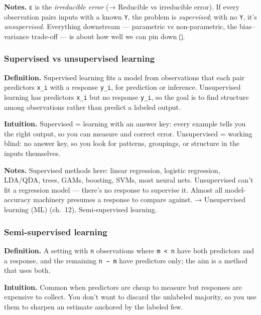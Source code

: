 \documentclass[
  10pt,
  letterpaper,
  onecolumn]{article}
\begin{document}
\textbf{Notes.} \texttt{ε} is the \emph{irreducible error} (→ Reducible
vs irreducible error). If every observation pairs inputs with a known
\texttt{Y}, the problem is \emph{supervised}; with no \texttt{Y}, it's
\emph{unsupervised}. Everything downstream --- parametric vs
non-parametric, the bias--variance trade-off --- is about how well we
can pin down \texttt{}.

\hypertarget{supervised-vs-unsupervised-learning}{%
\subsubsection{Supervised vs unsupervised
learning}\label{supervised-vs-unsupervised-learning}}

\textbf{Definition.} Supervised learning fits a model from observations
that each pair predictors \texttt{x\_i} with a response \texttt{y\_i},
for prediction or inference. Unsupervised learning has predictors
\texttt{x\_i} but no response \texttt{y\_i}, so the goal is to find
structure among observations rather than predict a labeled output.

\textbf{Intuition.} Supervised = learning with an answer key: every
example tells you the right output, so you can measure and correct
error. Unsupervised = working blind: no answer key, so you look for
patterns, groupings, or structure in the inputs themselves.

\textbf{Notes.} Supervised methods here: linear regression, logistic
regression, LDA/QDA, trees, GAMs, boosting, SVMs, most neural nets.
Unsupervised can't fit a regression model --- there's no response to
supervise it. Almost all model-accuracy machinery presumes a response to
compare against. → Unsupervised learning (ML) (ch.~12), Semi-supervised
learning.

\hypertarget{semi-supervised-learning}{%
\subsubsection{Semi-supervised
learning}\label{semi-supervised-learning}}

\textbf{Definition.} A setting with \texttt{n} observations where
\texttt{m\ \textless{}\ n} have both predictors and a response, and the
remaining \texttt{n\ −\ m} have predictors only; the aim is a method
that uses both.

\textbf{Intuition.} Common when predictors are cheap to measure but
responses are expensive to collect. You don't want to discard the
unlabeled majority, so you use them to sharpen an estimate anchored by
the labeled few.
\end{document}
